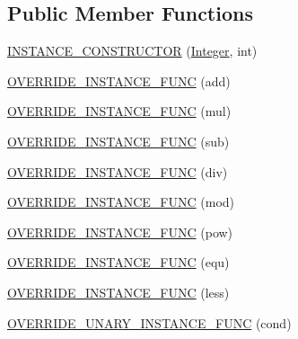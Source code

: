 \subsection*{Public Member Functions}
\begin{DoxyCompactItemize}
\item 
\mbox{\hyperlink{class_erable_1_1_erable_1_1_types_1_1_integer_ac3259433602dbc86d8cca86943360c5e}{I\+N\+S\+T\+A\+N\+C\+E\+\_\+\+C\+O\+N\+S\+T\+R\+U\+C\+T\+OR}} (\mbox{\hyperlink{class_erable_1_1_erable_1_1_types_1_1_integer}{Integer}}, int)
\item 
\mbox{\hyperlink{class_erable_1_1_erable_1_1_types_1_1_integer_a32d4ef66710ffb4807bd02be06d64deb}{O\+V\+E\+R\+R\+I\+D\+E\+\_\+\+I\+N\+S\+T\+A\+N\+C\+E\+\_\+\+F\+U\+NC}} (add)
\item 
\mbox{\hyperlink{class_erable_1_1_erable_1_1_types_1_1_integer_aa156654eed299b1c7f56f1cf5422a83d}{O\+V\+E\+R\+R\+I\+D\+E\+\_\+\+I\+N\+S\+T\+A\+N\+C\+E\+\_\+\+F\+U\+NC}} (mul)
\item 
\mbox{\hyperlink{class_erable_1_1_erable_1_1_types_1_1_integer_a7101c90dc3e8c549b5925d57a2336430}{O\+V\+E\+R\+R\+I\+D\+E\+\_\+\+I\+N\+S\+T\+A\+N\+C\+E\+\_\+\+F\+U\+NC}} (sub)
\item 
\mbox{\hyperlink{class_erable_1_1_erable_1_1_types_1_1_integer_aaa666bf8aa84e94778d90fa3bed6c97b}{O\+V\+E\+R\+R\+I\+D\+E\+\_\+\+I\+N\+S\+T\+A\+N\+C\+E\+\_\+\+F\+U\+NC}} (div)
\item 
\mbox{\hyperlink{class_erable_1_1_erable_1_1_types_1_1_integer_a066c9e7e76c4c85f514d8ef6fffbc05e}{O\+V\+E\+R\+R\+I\+D\+E\+\_\+\+I\+N\+S\+T\+A\+N\+C\+E\+\_\+\+F\+U\+NC}} (mod)
\item 
\mbox{\hyperlink{class_erable_1_1_erable_1_1_types_1_1_integer_a6b3639e57a885b88a2f82af2af859bd9}{O\+V\+E\+R\+R\+I\+D\+E\+\_\+\+I\+N\+S\+T\+A\+N\+C\+E\+\_\+\+F\+U\+NC}} (pow)
\item 
\mbox{\hyperlink{class_erable_1_1_erable_1_1_types_1_1_integer_a8c396342ada254f5a9b1648938300070}{O\+V\+E\+R\+R\+I\+D\+E\+\_\+\+I\+N\+S\+T\+A\+N\+C\+E\+\_\+\+F\+U\+NC}} (equ)
\item 
\mbox{\hyperlink{class_erable_1_1_erable_1_1_types_1_1_integer_a3fa48a081724d927ba917943bab8a1c7}{O\+V\+E\+R\+R\+I\+D\+E\+\_\+\+I\+N\+S\+T\+A\+N\+C\+E\+\_\+\+F\+U\+NC}} (less)
\item 
\mbox{\hyperlink{class_erable_1_1_erable_1_1_types_1_1_integer_a89db40c069ff7b7f4182f196ecf2d001}{O\+V\+E\+R\+R\+I\+D\+E\+\_\+\+U\+N\+A\+R\+Y\+\_\+\+I\+N\+S\+T\+A\+N\+C\+E\+\_\+\+F\+U\+NC}} (cond)
\end{DoxyCompactItemize}
